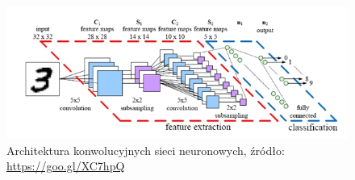 \begin{figure}[ht!]
\centering
\includegraphics[scale=0.75]{res/cnn3.jpg}
\caption[Caption for LOF]{Architektura konwolucyjnych sieci neuronowych, źródło: \url{https://goo.gl/XC7hpQ}\label{cnn3}} 
\end{figure}


